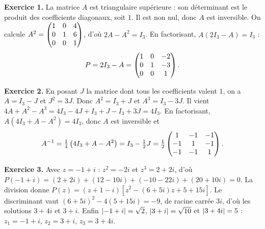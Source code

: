\begin{corrige}
\textbf{Exercice 1.} La matrice $A$ est triangulaire supérieure : son déterminant est
le produit des coefficients diagonaux, soit $1$. Il est non nul, donc $A$ est
inversible. On calcule $A^{2} = \begin{pmatrix} 1 & 0 & 4 \\ 0 & 1 & 6 \\ 0 & 0 & 1 \end{pmatrix}$, d'où
$2A-A^{2} = I_{3}$. En factorisant, $A\left(2I_{3}-A\right) = I_{3}$ :
\[
  P = 2I_{3}-A = \begin{pmatrix} 1 & 0 & -2 \\ 0 & 1 & -3 \\ 0 & 0 & 1 \end{pmatrix}.
\]

\textbf{Exercice 2.} En posant $J$ la matrice dont tous les coefficients valent $1$, on
a $A = I_{3}-J$ et $J^{2} = 3J$. Donc
$A^{2} = I_{3}+J$ et $A^{3} = I_{3}-3J$. Il vient
$4A+A^{2}-A^{3} = 4I_{3}-4J+I_{3}+J-I_{3}+3J = 4I_{3}$. En factorisant,
$A\left(4I_{3}+A-A^{2}\right) = 4I_{3}$, donc $A$ est inversible et
\[
  A^{-1} = \tfrac14\left(4I_{3}+A-A^{2}\right) = I_{3}-\tfrac12 J
  = \tfrac12\begin{pmatrix} 1 & -1 & -1 \\ -1 & 1 & -1 \\ -1 & -1 & 1 \end{pmatrix}.
\]

\textbf{Exercice 3.} Avec $z = -1+i$ : $z^{2} = -2i$ et $z^{3} = 2+2i$, d'où
$P(-1+i) = (2+2i)+(12-10i)+(-10-22i)+(20+10i) = 0$. La division donne
$P(z) = (z+1-i)\left[z^{2}-(6+5i)z+5+15i\right]$. Le discriminant vaut
$(6+5i)^{2}-4(5+15i) = -9$, de racine carrée $3i$, d'où les solutions
$3+4i$ et $3+i$. Enfin $\left|-1+i\right| = \sqrt2$, $\left|3+i\right| = \sqrt{10}$ et
$\left|3+4i\right| = 5$ : $z_{1} = -1+i$, $z_{2} = 3+i$, $z_{3} = 3+4i$.

\end{corrige}
